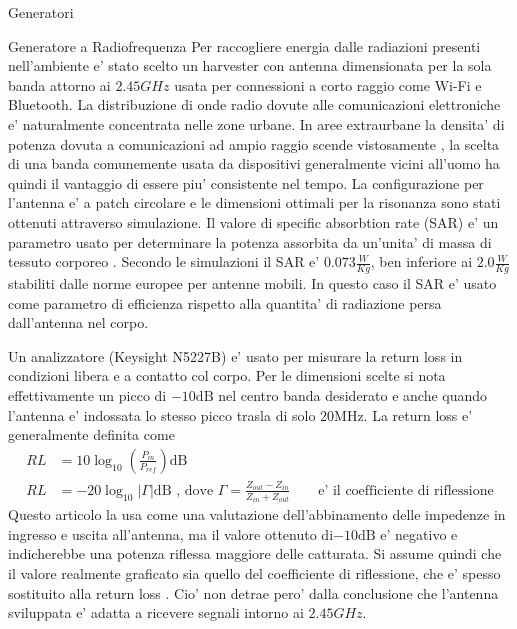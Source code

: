 \begin{section}{Generatori}
    \begin{subsection}{Generatore a Radiofrequenza}
        Per raccogliere energia dalle radiazioni presenti nell'ambiente e' stato scelto un harvester con antenna dimensionata per la sola banda attorno ai \(2.45GHz\) usata per connessioni a corto raggio come Wi-Fi e Bluetooth. La distribuzione di onde radio dovute alle comunicazioni elettroniche e' naturalmente concentrata nelle zone urbane. In aree extraurbane la densita' di potenza dovuta a comunicazioni ad ampio raggio scende vistosamente \cite{ibrahimRadioFrequencyEnergy2022}, la scelta di una banda comunemente usata da dispositivi generalmente vicini all'uomo ha quindi il vantaggio di essere piu' consistente nel tempo. La configurazione per l'antenna e' a patch circolare e le dimensioni ottimali per la risonanza sono stati ottenuti attraverso simulazione. Il valore di specific absorbtion rate (SAR) e' un parametro usato per determinare la potenza assorbita da un'unita' di massa di tessuto corporeo \cite{vallozzi26LatestDevelopments2016}. Secondo le simulazioni il SAR e' \(0.073\frac{W}{Kg}\), ben inferiore ai \(2.0\frac{W}{Kg}\) stabiliti dalle norme europee per antenne mobili. In questo caso il SAR e' usato come parametro di efficienza rispetto alla quantita' di radiazione persa dall'antenna nel corpo. 


        {\color{red}
        Un analizzatore (Keysight N5227B) e' usato per misurare la return loss in condizioni libera e a contatto col corpo. Per le dimensioni scelte si nota effettivamente un picco di \(-10\mathrm{dB}\) nel centro banda desiderato e anche quando l'antenna e' indossata lo stesso picco trasla di solo \(20\mathrm{MHz}\).
        La return loss e' generalmente definita come 
        \begin{equation*}
            \begin{aligned}
            RL&=10\log_{10}\left( \frac{P_{in}}{P_{ref}} \right) \mathrm{dB}\\
            RL&=-20\log_{10}\left|\Gamma\right|\mathrm{dB} \textrm{ , dove }\Gamma=\frac{Z_{out}-Z_{in}}{Z_{in}+Z_{out}}\hspace{2em} \textrm{e' il coefficiente di riflessione}
            \end{aligned}
        \end{equation*}
        Questo articolo la usa come una valutazione dell'abbinamento delle impedenze in ingresso e uscita all'antenna, ma il valore ottenuto di\(-10\mathrm{dB}\) e' negativo e indicherebbe una potenza riflessa maggiore delle catturata. Si assume quindi che il valore realmente graficato sia quello del coefficiente di riflessione, che e' spesso sostituito alla return loss \cite{birdDefinitionMisuseReturn2009}. Cio' non detrae pero' dalla conclusione che l'antenna sviluppata e' adatta a ricevere segnali intorno ai \(2.45GHz\).
        }


\end{subsection}
\end{section}

